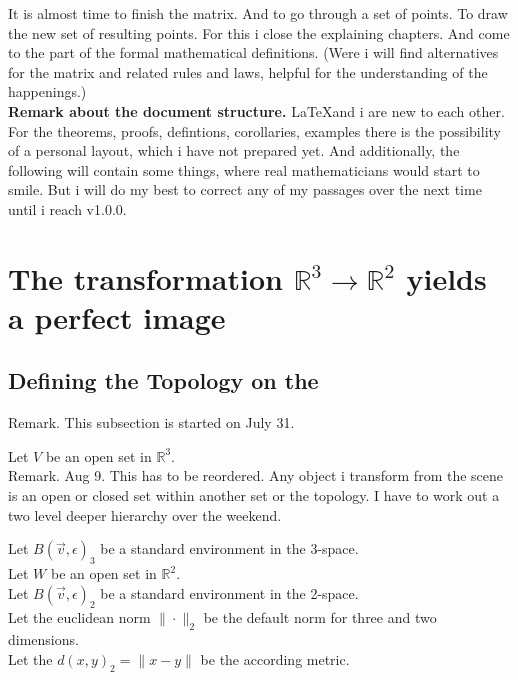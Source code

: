 \documentclass[a4paper]{article}
\begin{document}
\begin{Example}
It is almost time to finish the matrix. And to go through a set of points. To draw the new set of resulting points.
For this i close the explaining chapters. And come to the part of the formal mathematical definitions. (Were i will
find alternatives for the matrix and related rules and laws, helpful for the understanding of the happenings.)\\

\textbf{Remark about the document structure.} \LaTeX and i are new to each other. For the theorems, proofs, defintions, corollaries, examples there is the possibility of a personal layout, which i have not prepared yet. And additionally, the following will contain some things, where real
mathematicians would start to smile. But i will do my best to correct any of my passages over the next time until i reach v1.0.0.\\

\section{The transformation $\mathbb{R}^{3} \rightarrow \mathbb{R}^{2}$ yields a perfect image}

\subsection{Defining the Topology on the }

Remark. This subsection is started on July 31. 

Let $V$ be an open set in $\mathbb{R}^{3}$.\\

Remark. Aug 9. This has to be reordered. Any object i transform from the scene is an open or closed set within another set or the topology. I have to work out a two level deeper hierarchy over the weekend. 

Let $B(\vec{v}, \epsilon)_{3}$ be a standard environment in the 3-space.\\

Let $W$ be an open set in $\mathbb{R}^{2}$.\\

Let $B(\vec{v}, \epsilon)_{2}$ be a standard environment in the 2-space.\\

Let the euclidean norm $\|\cdot\|_{2}$ be the default norm for three and two dimensions.\\

Let the $d(x,y)_{2} = \|x-y\|$ be the according metric.\\


\end{Example}
\end{document}
